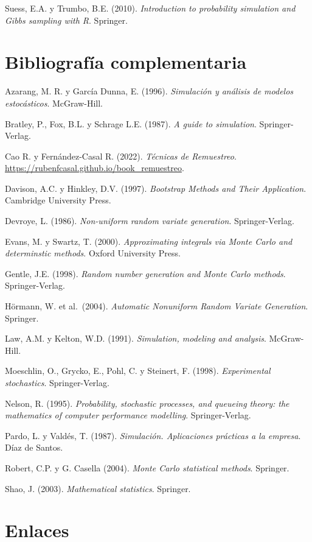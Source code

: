 \documentclass[
  10pt,
]{book}
\theoremstyle{break}
\theoremstyle{nonumberplain}
\begin{document}
Suess, E.A. y Trumbo, B.E. (2010). \emph{Introduction to probability simulation and Gibbs sampling with R}. Springer.

\hypertarget{bibliografuxeda-complementaria}{%
\section*{Bibliografía complementaria}\label{bibliografuxeda-complementaria}}

Azarang, M. R. y García Dunna, E. (1996). \emph{Simulación y análisis de modelos estocásticos}. McGraw-Hill.

Bratley, P., Fox, B.L. y Schrage L.E. (1987). \emph{A guide to simulation}. Springer-Verlag.

Cao R. y Fernández-Casal R. (2022). \emph{Técnicas de Remuestreo}. \url{https://rubenfcasal.github.io/book_remuestreo}.

Davison, A.C. y Hinkley, D.V. (1997). \emph{Bootstrap Methods and Their Application}. Cambridge University Press.

Devroye, L. (1986). \emph{Non-uniform random variate generation}. Springer-Verlag.

Evans, M. y Swartz, T. (2000). \emph{Approximating integrals via Monte Carlo and determinstic methods}. Oxford University Press.

Gentle, J.E. (1998). \emph{Random number generation and Monte Carlo methods}. Springer-Verlag.

Hörmann, W. et al.~(2004). \emph{Automatic Nonuniform Random Variate Generation}. Springer.

Law, A.M. y Kelton, W.D. (1991). \emph{Simulation, modeling and analysis}. McGraw-Hill.

Moeschlin, O., Grycko, E., Pohl, C. y Steinert, F. (1998). \emph{Experimental stochastics}. Springer-Verlag.

Nelson, R. (1995). \emph{Probability, stochastic processes, and queueing theory: the mathematics of computer performance modelling}. Springer-Verlag.

Pardo, L. y Valdés, T. (1987). \emph{Simulación. Aplicaciones prácticas a la empresa}. Díaz de Santos.

Robert, C.P. y G. Casella (2004). \emph{Monte Carlo statistical methods}. Springer.

Shao, J. (2003). \emph{Mathematical statistics}. Springer.

\hypertarget{links}{%
\section*{Enlaces}\label{links}}
\end{document}
